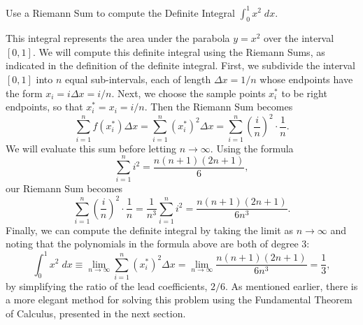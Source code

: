 \documentclass[handout]{ximera}
\begin{document}
\begin{example}[example 5]
Use a Riemann Sum to compute the Definite Integral $\displaystyle{\int_0^1 x^2 \; dx}$.

This integral represents the area under the parabola $y = x^2$ over the interval $[0,1]$. 
We will compute this definite integral using the Riemann Sums, as indicated in the definition of the definite integral.
First, we subdivide the interval $[0,1]$ into $n$ equal sub-intervals, each of length 
$\Delta x= 1/n$ whose endpoints have the form $x_i = i\Delta x = i/n$.  Next, we choose the sample points $x_i^*$
to be right endpoints, so that $x_i^* = x_i = i/n$. Then the Riemann Sum becomes
\[
\sum_{i = 1}^n f(x_i^*) \Delta x =  \sum_{i = 1}^n \left(x_i^*\right)^2 \Delta x = \sum_{i = 1}^n \left(\frac{i}{n}\right)^2 \cdot \frac{1}{n}.
\]
We will evaluate this sum before letting $n\to \infty$. Using the formula
\[
\sum_{i = 1}^n i^2 = \frac{n(n+1)(2n+1)}{6},
\]
our Riemann Sum becomes
\[
\sum_{i = 1}^n \left(\frac{i}{n}\right)^2 \cdot \frac{1}{n} = \frac{1}{n^3} \sum_{i = 1}^n i^2 = \frac{n(n+1)(2n+1)}{6n^3}.
\]
Finally, we can compute the definite integral by taking the limit as $n \to \infty$ and noting that the polynomials in the formula above are both of degree 3:
\[
\int_0^1 x^2 \; dx \equiv \lim_{n \to \infty} \sum_{i = 1}^n \left(x_i^*\right)^2 \Delta x = \lim_{n \to \infty} \frac{n(n+1)(2n+1)}{6n^3} = \frac{1}{3},
\]
by simplifying the ratio of the lead coefficients, $2/6$.
As mentioned earlier, there is a more elegant method for solving this problem using the Fundamental Theorem of Calculus, presented in the next section.

\end{example}
\end{document}

